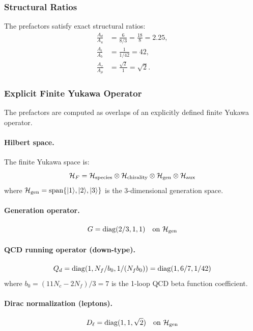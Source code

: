 \subsubsection{Structural Ratios}

The prefactors satisfy exact structural ratios:
\begin{align}
\frac{A_d}{A_u} &= \frac{6}{8/3} = \frac{18}{8} = 2.25, \\
\frac{A_t}{A_b} &= \frac{1}{1/42} = 42, \\
\frac{A_\tau}{A_\mu} &= \frac{\sqrt{2}}{1} = \sqrt{2}.
\end{align}

\subsubsection{Explicit Finite Yukawa Operator}

The prefactors are computed as overlaps of an explicitly defined finite Yukawa operator.

\paragraph{Hilbert space.}
The finite Yukawa space is:
\begin{equation}
\mathcal{H}_F = \mathcal{H}_{\rm species} \otimes \mathcal{H}_{\rm chirality} \otimes \mathcal{H}_{\rm gen} \otimes \mathcal{H}_{\rm aux}
\end{equation}
where $\mathcal{H}_{\rm gen} = {\rm span}\{|1\rangle, |2\rangle, |3\rangle\}$ is the 3-dimensional generation space.

\paragraph{Generation operator.}
\begin{equation}
G = {\rm diag}(2/3, 1, 1) \quad \text{on } \mathcal{H}_{\rm gen}
\end{equation}

\paragraph{QCD running operator (down-type).}
\begin{equation}
Q_d = {\rm diag}(1, N_f/b_0, 1/(N_f b_0)) = {\rm diag}(1, 6/7, 1/42)
\end{equation}
where $b_0 = (11 N_c - 2 N_f)/3 = 7$ is the 1-loop QCD beta function coefficient.

\paragraph{Dirac normalization (leptons).}
\begin{equation}
D_\ell = {\rm diag}(1, 1, \sqrt{2}) \quad \text{on } \mathcal{H}_{\rm gen}
\end{equation}

